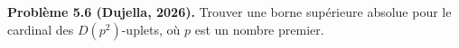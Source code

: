 \textbf{Problème 5.6 (Dujella, 2026).} Trouver une borne supérieure absolue pour le cardinal des $D(p^2)$-uplets, où $p$ est un nombre premier.

